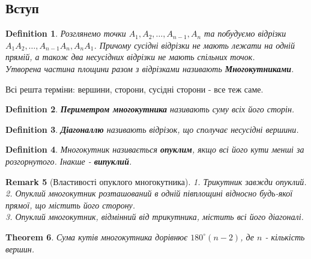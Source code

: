 \documentclass[a4paper, 10pt]{article}
\theoremstyle{theoremdd}
\newtheorem{theorem}{Theorem}[subsection]
\theoremstyle{theoremdd}
\theoremstyle{theoremdd}
\newtheorem{definition}[theorem]{Definition}
\theoremstyle{theoremdd}
\theoremstyle{theoremdd}
\theoremstyle{theoremdd}
\theoremstyle{theoremdd}
\newtheorem{remark}[theorem]{Remark}
\theoremstyle{theoremdd}
\theoremstyle{theoremdd}
\begin{document}
\subsection{Вступ}
\begin{definition}
Розглянемо точки $A_1,A_2,\dots,A_{n-1}, A_n$ та побудуємо відрізки $A_1A_2,\dots, A_{n-1}A_n, A_nA_1$. Причому сусідні відрізки не мають лежати на одній прямій, а також два несусідних відрізки не мають спільних точок.\\
Утворена частина площини разом з відрізками називають \textbf{Многокутниками}.
\begin{figure}[H]
\centering
{}
\end{figure}
\end{definition}
Всі решта терміни: вершини, сторони, сусідні сторони - все теж саме.
\begin{definition}
\textbf{Периметром многокутника} називають суму всіх його сторін.
\end{definition}

\begin{definition}
\textbf{Діагоналлю} називають відрізок, що сполучає несусідні вершини.
\end{definition}

\begin{definition}
Многокутник називається \textbf{опуклим}, якщо всі його кути менші за розгорнутого. Інакше - \textbf{випуклий}.
\end{definition}

\begin{remark}[Властивості опуклого многокутника]
1. Трикутник завжди опуклий.\\
2. Опуклий многокутник розташований в одній півплощині відносно будь-якої прямої, що містить його сторону.\\
3. Опуклий многокутник, відмінний від трикутника, містить всі його діагоналі.
\end{remark}

\begin{theorem}
Сума кутів многокутника дорівнює $180^\circ (n-2)$, де $n$ - кількість вершин.
\end{theorem}
\end{document}
